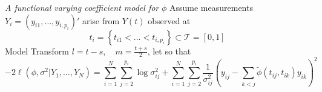\begin{frame}{\textit{A functional varying coefficient model for} $\phi$ }%
\footnotesize
Assume measurements $Y_i = \left(y_{i1}, \dots, y_{i,p_i}\right)'$ arise from $Y\left(t\right)$ observed at 
\[
t_{i} = \left\{t_{i1} <  \dots < t_{i,p_i}\right\} \subset \mathcal{T} = \left[0,1\right]
\]
Model
Transform $l = t - s, \quad m = \frac{t + s}{2}$, let
so that
\begin{equation} \label{eq:full-joint-likelihood}
-2\ell\left(\phi, \sigma^2 \vert Y_1,\dots, Y_N \right) = \sum_{i=1}^N \sum_{j=2}^{p_i} \log \sigma_{ij}^2+  \sum_{i=1}^N \sum_{j=2}^{p_i} \frac{1}{\sigma^{2}_{ij}}\left( y_{ij} - \sum_{k<j} \tilde{\phi}\left(t_{ij}, t_{ik}\right) y_{ik}  \right)^2
\end{equation}
\end{frame}




